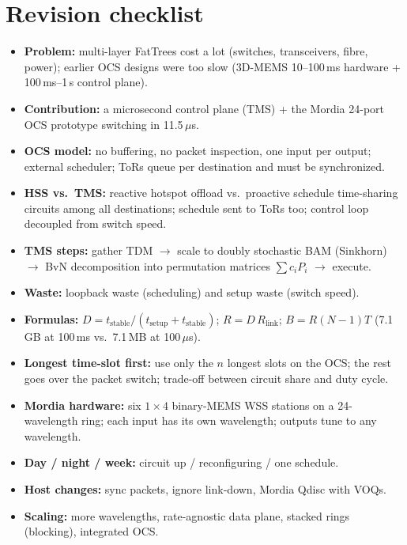 \section{Revision checklist}
\begin{itemize}
\item \textbf{Problem:} multi-layer FatTrees cost a lot (switches, transceivers, fibre, power); earlier OCS designs were too slow (3D-MEMS 10--100\,ms hardware + 100\,ms--1\,s control plane).
\item \textbf{Contribution:} a microsecond control plane (TMS) + the Mordia 24-port OCS prototype switching in 11.5\,$\mu$s.
\item \textbf{OCS model:} no buffering, no packet inspection, one input per output; external scheduler; ToRs queue per destination and must be synchronized.
\item \textbf{HSS vs.\ TMS:} reactive hotspot offload vs.\ proactive schedule time-sharing circuits among all destinations; schedule sent to ToRs too; control loop decoupled from switch speed.
\item \textbf{TMS steps:} gather TDM $\to$ scale to doubly stochastic BAM (Sinkhorn) $\to$ BvN decomposition into permutation matrices $\sum c_iP_i$ $\to$ execute.
\item \textbf{Waste:} loopback waste (scheduling) and setup waste (switch speed).
\item \textbf{Formulas:} $D=t_{\text{stable}}/(t_{\text{setup}}+t_{\text{stable}})$; $R=D\,R_{\text{link}}$; $B=R(N-1)T$ (7.1\,GB at 100\,ms vs.\ 7.1\,MB at 100\,$\mu$s).
\item \textbf{Longest time-slot first:} use only the $n$ longest slots on the OCS; the rest goes over the packet switch; trade-off between circuit share and duty cycle.
\item \textbf{Mordia hardware:} six $1\times4$ binary-MEMS WSS stations on a 24-wavelength ring; each input has its own wavelength; outputs tune to any wavelength.
\item \textbf{Day / night / week:} circuit up / reconfiguring / one schedule.
\item \textbf{Host changes:} sync packets, ignore link-down, Mordia Qdisc with VOQs.
\item \textbf{Scaling:} more wavelengths, rate-agnostic data plane, stacked rings (blocking), integrated OCS.
\end{itemize}
